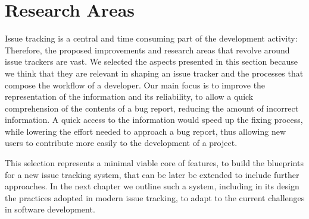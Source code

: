 \section{Research Areas}

Issue tracking is a central and time consuming part of the development activity: Therefore, the proposed improvements and research areas that revolve around issue trackers are vast.
We selected the aspects presented in this section because we think that they are relevant in shaping an issue tracker and the processes that compose the workflow of a developer. Our main focus is to improve the representation of the information and its reliability, to allow a quick comprehension of the contents of a bug report, reducing the amount of incorrect information. A quick access to the information would speed up the fixing process, while lowering the effort needed to approach a bug report, thus allowing new users to contribute more easily to the development of a project.

This selection represents a minimal viable core of features, to build the blueprints for a new issue tracking system, that can be later be extended to include further approaches. In the next chapter we outline such a system, including in its design the practices adopted in modern issue tracking, to adapt to the current challenges in software development.


